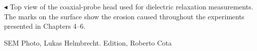 
\renewcommand\thefigure{\thechapter.\arabic{figure}}
\renewcommand{\thesection}{\thechapter.\arabic{section}}
\normalsize


\thispagestyle{empty}


\clearpage



\begin{savequote}[75mm]
$\blacktriangleleft$ Top view of the coaxial-probe head used for dielectric relaxation measurements. The marks on the surface show the erosion caused throughout the experiments presented in Chapters 4--6.

\vspace{3pt}

SEM Photo, Lukas Helmbrecht. Edition, Roberto Cota
\end{savequote}




